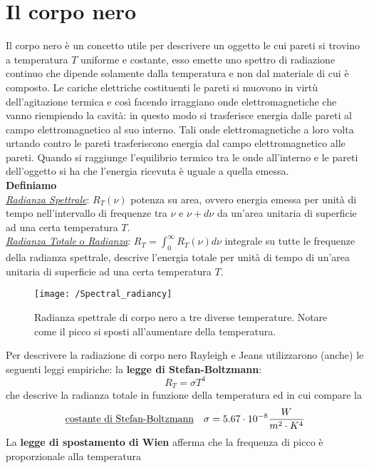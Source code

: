 

\section{Il corpo nero}
Il corpo nero è un concetto utile per descrivere un oggetto le cui pareti si trovino a temperatura $T$ uniforme e costante, esso emette uno spettro di radiazione continuo che dipende solamente dalla temperatura e non dal materiale di cui è composto.
Le cariche elettriche costituenti le pareti si muovono in virtù dell'agitazione termica e così facendo irraggiano onde elettromagnetiche che vanno riempiendo la cavità: in questo modo si trasferisce energia dalle pareti al campo elettromagnetico al suo interno.
Tali onde elettromagnetiche a loro volta urtando contro le pareti trasferiscono energia dal campo elettromagnetico alle pareti.
Quando si raggiunge l'equilibrio termico tra le onde all'interno e le pareti dell'oggetto si ha che l'energia ricevuta è uguale a quella emessa.\\
\textbf{Definiamo} \\
\underline{\textit{Radianza Spettrale}}: $R_T(\nu)$ potenza su area, ovvero energia emessa per unità di tempo nell'intervallo di frequenze tra $\nu$ e $\nu+d\nu$ da un'area unitaria di superficie ad una certa temperatura $T$. \\
\underline{\textit{Radianza Totale} o \textit{Radianza}}: $R_T= \int_0^{\infty} R_T(\nu)d\nu$ integrale su tutte le frequenze della radianza spettrale, descrive l'energia totale per unità di tempo di un'area unitaria di superficie ad una certa temperatura $T$.
\begin{figure}[h]
\centering
\texttt{[image: /Spectral\_radiancy]}
\caption{Radianza spettrale di corpo nero a tre diverse temperature. Notare come il picco si sposti all'aumentare della temperatura.}
\end{figure}
Per descrivere la radiazione di corpo nero Rayleigh e Jeans utilizzarono (anche) le seguenti leggi empiriche:
la \textbf{legge di Stefan-Boltzmann}:
\begin{equation}
R_T = \sigma T^4
\end{equation}
che descrive la radianza totale in funzione della temperatura ed in cui compare la 
\begin{equation}
\mbox{\underline{costante di Stefan-Boltzmann}} \quad \sigma = 5.67 \cdot 10^{-8} \frac{W}{m^2 \cdot K^4}
\end{equation}
La \textbf{legge di spostamento di Wien} afferma che la frequenza di picco è proporzionale alla temperatura
